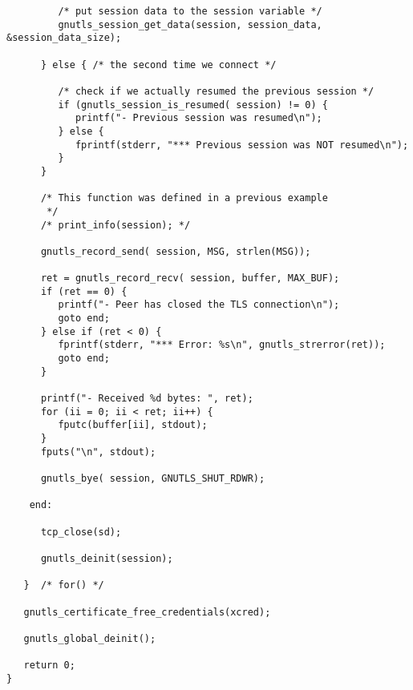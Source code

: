 \begin{verbatim}
         /* put session data to the session variable */
         gnutls_session_get_data(session, session_data, &session_data_size);

      } else { /* the second time we connect */

         /* check if we actually resumed the previous session */
         if (gnutls_session_is_resumed( session) != 0) {
            printf("- Previous session was resumed\n");
         } else {
            fprintf(stderr, "*** Previous session was NOT resumed\n");
         }
      }

      /* This function was defined in a previous example
       */
      /* print_info(session); */

      gnutls_record_send( session, MSG, strlen(MSG));

      ret = gnutls_record_recv( session, buffer, MAX_BUF);
      if (ret == 0) {
         printf("- Peer has closed the TLS connection\n");
         goto end;
      } else if (ret < 0) {
         fprintf(stderr, "*** Error: %s\n", gnutls_strerror(ret));
         goto end;
      }

      printf("- Received %d bytes: ", ret);
      for (ii = 0; ii < ret; ii++) {
         fputc(buffer[ii], stdout);
      }
      fputs("\n", stdout);

      gnutls_bye( session, GNUTLS_SHUT_RDWR);

    end:

      tcp_close(sd);

      gnutls_deinit(session);

   }  /* for() */

   gnutls_certificate_free_credentials(xcred);

   gnutls_global_deinit();

   return 0;
}

\end{verbatim}
